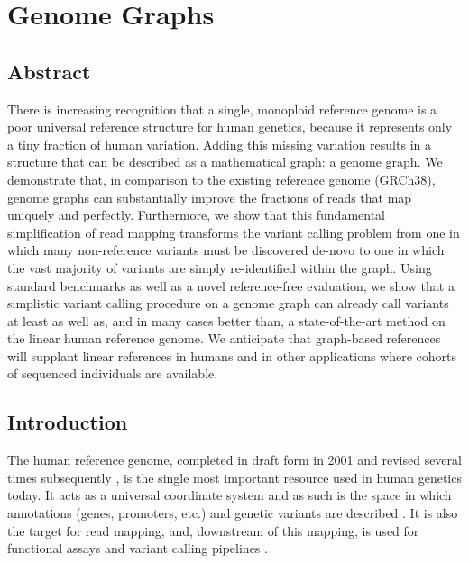 
\chapter{Genome Graphs}
\label{ch:bakeoff}


\section{Abstract}

There is increasing recognition that a single, monoploid reference
genome is a poor universal reference structure for human genetics,
because it represents only a tiny fraction of human variation. Adding
this missing variation results in a structure that can be described as a
mathematical graph: a genome graph. We demonstrate that, in comparison
to the existing reference genome (GRCh38), genome graphs can
substantially improve the fractions of reads that map uniquely and
perfectly. Furthermore, we show that this fundamental simplification of
read mapping transforms the variant calling problem from one in which
many non-reference variants must be discovered de-novo to one in which
the vast majority of variants are simply re-identified within the graph.
Using standard benchmarks as well as a novel reference-free evaluation,
we show that a simplistic variant calling procedure on a genome graph
can already call variants at least as well as, and in many cases better
than, a state-of-the-art method on the linear human reference genome. We
anticipate that graph-based references will supplant linear references
in humans and in other applications where cohorts of sequenced
individuals are available.

\section{Introduction}

The human reference genome, completed in draft form in 2001 and revised
several times subsequently \cite{Lander2001-gm,Church2011-ob}, is the
single most important resource used in human genetics today. It acts as
a universal coordinate system and as such is the space in which
annotations (genes, promoters, etc.) and genetic variants are described
\cite{Harrow2012-ei,ENCODE_Project_Consortium2012-rx,1000_Genomes_Project_Consortium2015-mp}.
It is also the target for read mapping, and, downstream of this mapping,
is used for functional assays and variant calling pipelines
\cite{Li2009-tj,depristo2011framework}.

